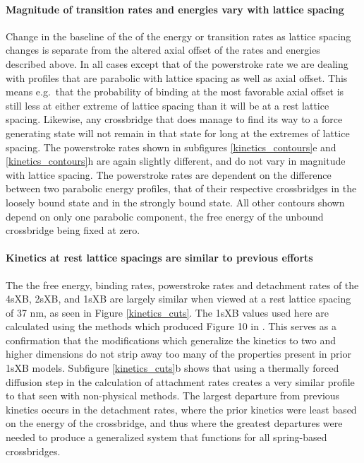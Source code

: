 \documentclass[]{article}
\begin{document}
\paragraph{Magnitude of transition rates and energies vary with lattice spacing} %
Change in the baseline of the of the energy or transition rates as lattice spacing changes is separate from the altered axial offset of the rates and energies described above.
In all cases except that of the powerstroke rate we are dealing with profiles that are parabolic with lattice spacing as well as axial offset. 
This means e.g.\ that the probability of binding at the most favorable axial offset is still less at either extreme of lattice spacing than it will be at a rest lattice spacing. 
Likewise, any crossbridge that does manage to find its way to a force generating state will not remain in that state for long at the extremes of lattice spacing.
The powerstroke rates shown in subfigures \ref{kinetics_contours}e and \ref{kinetics_contours}h are again slightly different, and do not vary in magnitude with lattice spacing.
The powerstroke rates are dependent on the difference between two parabolic energy profiles, that of their respective crossbridges in the loosely bound state and in the strongly bound state. 
All other contours shown depend on only one parabolic component, the free energy of the unbound crossbridge being fixed at zero.


\paragraph{Kinetics at rest lattice spacings are similar to previous efforts} %
The the free energy, binding rates, powerstroke rates and detachment rates of the 4sXB, 2sXB, and 1sXB are largely similar when viewed at a rest lattice spacing of 37 nm, as seen in Figure \ref{kinetics_cuts}.
The 1sXB values used here are calculated using the methods which produced Figure 10 in \citet{Tanner:2007:pe115}. 
This serves as a confirmation that the modifications which generalize the kinetics to two and higher dimensions do not strip away too many of the properties present in prior 1sXB models. 
Subfigure \ref{kinetics_cuts}b shows that using a thermally forced diffusion step in the calculation of attachment rates creates a very similar profile to that seen with non-physical methods.
The largest departure from previous kinetics occurs in the detachment rates, where the prior kinetics were least based on the energy of the crossbridge, and thus where the greatest departures were needed to produce a generalized system that functions for all spring-based crossbridges.
\end{document}
